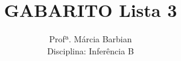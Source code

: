 \documentclass[10pt,brazil,addpoints]{exam}
\begin{document}
\title{GABARITO Lista 3}


\author{
  Profª. Márcia Barbian \\
  Disciplina: Inferência B\\
  \date{}
}


\maketitle
\end{document}
